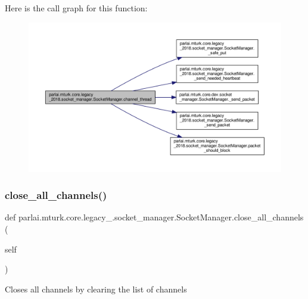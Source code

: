 Here is the call graph for this function\+:
\nopagebreak
\begin{figure}[H]
\begin{center}
\leavevmode
\includegraphics[width=350pt]{classparlai_1_1mturk_1_1core_1_1legacy__2018_1_1socket__manager_1_1SocketManager_a762590d50448509a5986c27a60dfea1a_cgraph}
\end{center}
\end{figure}
\mbox{\label{classparlai_1_1mturk_1_1core_1_1legacy__2018_1_1socket__manager_1_1SocketManager_ab005f976aeba162ce019724c0e093cae}} 
\subsubsection{\texorpdfstring{close\+\_\+all\+\_\+channels()}{close\_all\_channels()}}
{\footnotesize\ttfamily def parlai.\+mturk.\+core.\+legacy\+\_.\+socket\+\_\+manager.\+Socket\+Manager.\+close\+\_\+all\+\_\+channels (\begin{DoxyParamCaption}\item[{}]{self }\end{DoxyParamCaption})}

\begin{DoxyVerb}Closes all channels by clearing the list of channels\end{DoxyVerb}
 

